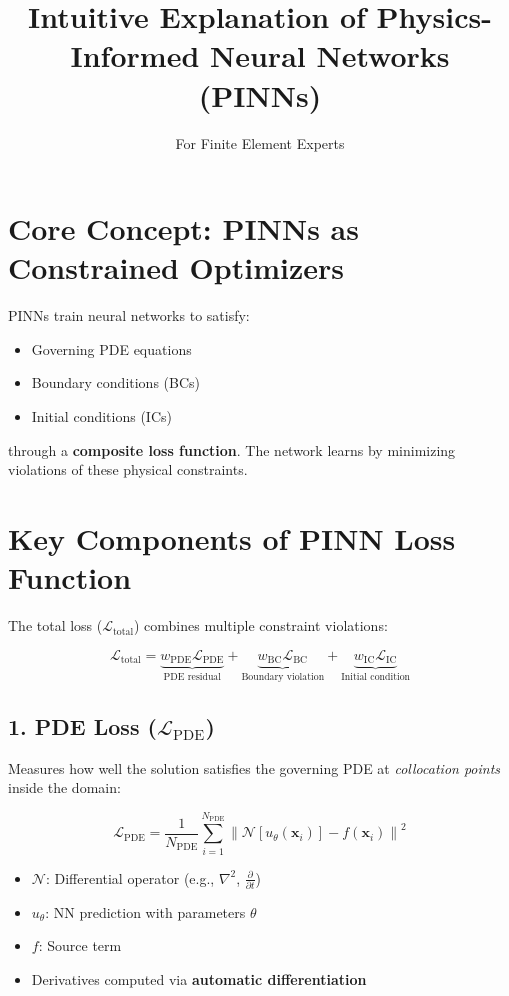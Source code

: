 \documentclass[12pt]{article}
\title{Intuitive Explanation of Physics-Informed Neural Networks (PINNs)}
\author{For Finite Element Experts}
\date{}
\begin{document}
\maketitle

\section*{Core Concept: PINNs as Constrained Optimizers}
PINNs train neural networks to satisfy:
\begin{itemize}
    \item Governing PDE equations
    \item Boundary conditions (BCs)
    \item Initial conditions (ICs)
\end{itemize}
through a \textbf{composite loss function}. The network learns by minimizing violations of these physical constraints.

\section*{Key Components of PINN Loss Function}
The total loss ($\mathcal{L}_{\text{total}}$) combines multiple constraint violations:

\begin{equation}
\mathcal{L}_{\text{total}} = \underbrace{w_{\text{PDE}} \mathcal{L}_{\text{PDE}}}_{\text{PDE residual}} + 
\underbrace{w_{\text{BC}} \mathcal{L}_{\text{BC}}}_{\text{Boundary violation}} + 
\underbrace{w_{\text{IC}} \mathcal{L}_{\text{IC}}}_{\text{Initial condition}}
\end{equation}

\subsection*{1. PDE Loss ($\mathcal{L}_{\text{PDE}}$)}
Measures how well the solution satisfies the governing PDE at \textit{collocation points} inside the domain:

\begin{equation}
\mathcal{L}_{\text{PDE}} = \frac{1}{N_{\text{PDE}}} \sum_{i=1}^{N_{\text{PDE}}} \left\| \mathcal{N}[u_{\theta}(\mathbf{x}_i)] - f(\mathbf{x}_i) \right\|^2
\end{equation}

\begin{itemize}
    \item $\mathcal{N}$: Differential operator (e.g., $\nabla^2$, $\frac{\partial}{\partial t}$)
    \item $u_{\theta}$: NN prediction with parameters $\theta$
    \item $f$: Source term
    \item Derivatives computed via \textbf{automatic differentiation}
\end{itemize}
\end{document}
